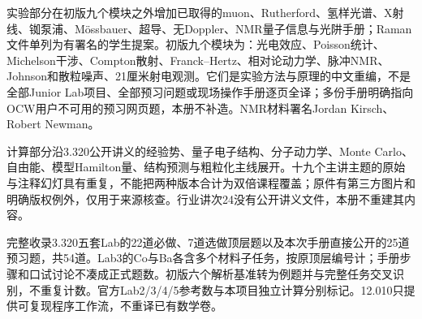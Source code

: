实验部分在初版九个模块之外增加已取得的muon、Rutherford、氢样光谱、X射线、铷泵浦、Mössbauer、超导、无Doppler、NMR量子信息与光阱手册；Raman文件单列为有署名的学生提案。初版九个模块为：光电效应、Poisson统计、Michelson干涉、Compton散射、Franck--Hertz、相对论动力学、脉冲NMR、Johnson和散粒噪声、21厘米射电观测。它们是实验方法与原理的中文重编，不是全部Junior Lab项目、全部预习问题或现场操作手册逐页全译；多份手册明确指向OCW用户不可用的预习网页题，本册不补造。NMR材料署名Jordan Kirsch、Robert Newman。

计算部分沿3.320公开讲义的经验势、量子电子结构、分子动力学、Monte Carlo、自由能、模型Hamilton量、结构预测与粗粒化主线展开。十九个主讲主题的原始与注释幻灯具有重复，不能把两种版本合计为双倍课程覆盖；原件有第三方图片和明确版权例外，仅用于来源核查。行业讲次24没有公开讲义文件，本册不重建其内容。

完整收录3.320五套Lab的22道必做、7道选做顶层题以及本次手册直接公开的25道预习题，共54道。Lab3的Co与Ba各含多个材料子任务，按原顶层编号计；手册步骤和口试讨论不凑成正式题数。初版六个解析基准转为例题并与完整任务交叉识别，不重复计数。官方Lab2/3/4/5参考数与本项目独立计算分别标记。12.010只提供可复现程序工作流，不重译已有数学卷。


